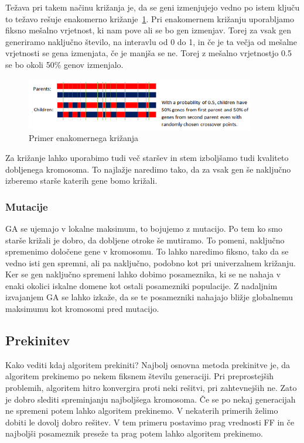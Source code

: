 \documentclass[a4paper, 12pt]{book}
\begin{document}
Težava pri takem načinu križanja je, da se geni izmenjujejo vedno po istem ključu to težavo rešuje enakomerno križanje~\ref{picUni}. Pri enakomernem križanju uporabljamo fiksno mešalno  vrjetnost, ki nam pove ali se bo gen izmenjav. Torej za vsak gen generiramo naključno število, na interavlu od 0 do 1, in če je ta večja od mešalne vrjetnosti se gena izmenjata, če je manjša se ne. Torej z mešalno vrjetnostjo 0.5 se bo okoli 50\% genov izmenjalo.
\begin{figure}[H]
\begin{center}
\includegraphics[width=10cm]{UniformCrossover.png}
\end{center}
\caption{Primer enakomernega križanja}
\label{picUni}
\end{figure}
Za križanje lahko uporabimo tudi več staršev in stem izboljšamo tudi kvaliteto dobljenega kromosoma. To najlažje naredimo tako, da za vsak gen še naključno izberemo starše katerih gene bomo križali.
\subsubsection{Mutacije}
GA se ujemajo v lokalne maksimum, to bojujemo z mutacijo. Po tem ko smo starše križali je dobro, da dobljene otroke še mutiramo. To pomeni, naključno spremenimo določene gene v kromosomu. To lahko naredimo fiksno, tako da se vedno isti gen spremni, ali pa naključno, podobno kot pri univerzalnem križanju. Ker se gen naključno spremeni lahko dobimo posameznika, ki se ne nahaja v enaki okolici iskalne domene kot ostali posamezniki populacije. Z nadaljnim izvajanjem GA se lahko izkaže, da se te posamezniki nahajajo bližje globalnemu maksimumu kot kromosomi pred mutacijo.
\subsection{Prekinitev}
Kako vediti kdaj algoritem prekiniti? Najbolj osnovna metoda prekinitve je, da algoritem prekinemo po nekem fiksnem številu generaciji. Pri preprostejših problemih, algoritem hitro konvergira proti neki rešitvi, pri zahtevnejših ne. Zato je dobro slediti spreminjanju najboljšega kromosoma. Če se po nekaj generacijah ne spremeni potem lahko algoritem prekinemo. V nekaterih primerih želimo dobiti le dovolj dobro rešitev. V tem primeru postavimo prag vrednosti FF in če najboljši posameznik preseže ta prag potem lahko algoritem prekinemo.
\end{document}
